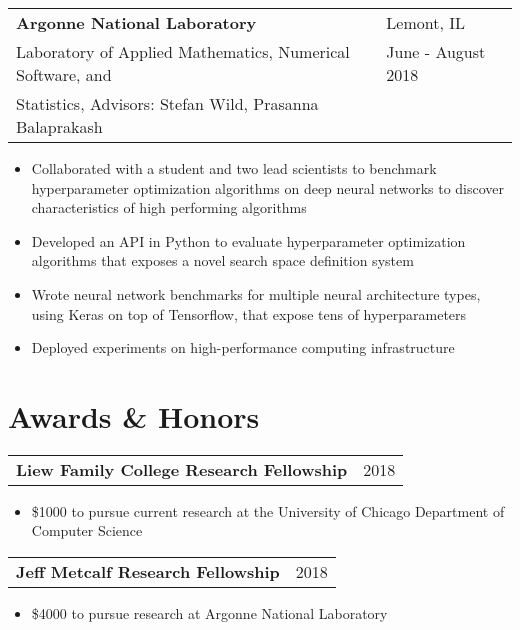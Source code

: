 \documentclass[letterpaper, 12pt]{article}
\begin{document}
\begin{tabular}{@{} L{12cm} @{} R{4.51cm} @{}}
  \textbf{Argonne National Laboratory} & Lemont, IL \\
  Laboratory of Applied Mathematics, Numerical Software, and & June - August 2018 \\
  Statistics, Advisors: Stefan Wild, Prasanna Balaprakash & \\
\end{tabular}
\vspace{-10pt}
\begin{itemize}
  \item Collaborated with a student and two lead scientists to benchmark hyperparameter optimization algorithms on deep neural networks to discover characteristics of high performing algorithms 
  \item Developed an API in Python to evaluate hyperparameter optimization algorithms that exposes a novel search space definition system 
  \item Wrote neural network benchmarks for multiple neural architecture types, using Keras on top of Tensorflow, that expose tens of hyperparameters 
  \item Deployed experiments on high-performance computing infrastructure 
\end{itemize}

\section{Awards \& Honors}
\vspace{10pt}
\begin{tabular}{@{} L{12cm} @{} R{4.51cm} @{}}
  \textbf{Liew Family College Research Fellowship} & 2018 \\
\end{tabular}
\vspace{-20pt}
\begin{itemize}
  \item \$1000 to pursue current research at the University of Chicago Department of Computer Science
\end{itemize}

\begin{tabular}{@{} L{12cm} @{} R{4.51cm} @{}}
  \textbf{Jeff Metcalf Research Fellowship} & 2018 \\
\end{tabular}
\vspace{-20pt}
\begin{itemize}
  \item \$4000 to pursue research at Argonne National Laboratory
\end{itemize}
\end{document}
